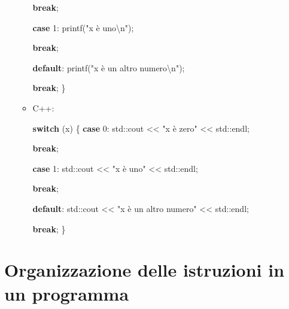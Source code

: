 \documentclass[
  letterpaper,
]{scrbook}
\newenvironment{Shaded}{\begin{snugshade}}{\end{snugshade}}
\newcommand{\BuiltInTok}[1]{\textcolor[rgb]{0.00,0.23,0.31}{#1}}
\newcommand{\ControlFlowTok}[1]{\textcolor[rgb]{0.00,0.23,0.31}{\textbf{#1}}}
\newcommand{\DecValTok}[1]{\textcolor[rgb]{0.68,0.00,0.00}{#1}}
\newcommand{\NormalTok}[1]{\textcolor[rgb]{0.00,0.23,0.31}{#1}}
\newcommand{\OperatorTok}[1]{\textcolor[rgb]{0.37,0.37,0.37}{#1}}
\newcommand{\SpecialCharTok}[1]{\textcolor[rgb]{0.37,0.37,0.37}{#1}}
\newcommand{\StringTok}[1]{\textcolor[rgb]{0.13,0.47,0.30}{#1}}
\begin{document}
\begin{itemize}
\begin{itemize}
\begin{Shaded}
\begin{Highlighting}[]
    \ControlFlowTok{break}\OperatorTok{;}

  \ControlFlowTok{case} \DecValTok{1}\OperatorTok{:}
\NormalTok{    printf}\OperatorTok{(}\StringTok{"x è uno}\SpecialCharTok{\textbackslash{}n}\StringTok{"}\OperatorTok{);}

    \ControlFlowTok{break}\OperatorTok{;}

  \ControlFlowTok{default}\OperatorTok{:}
\NormalTok{    printf}\OperatorTok{(}\StringTok{"x è un altro numero}\SpecialCharTok{\textbackslash{}n}\StringTok{"}\OperatorTok{);}

    \ControlFlowTok{break}\OperatorTok{;}
\OperatorTok{\}}
\end{Highlighting}
\end{Shaded}
  \item
    C++:

\begin{Shaded}
\begin{Highlighting}[]
\ControlFlowTok{switch} \OperatorTok{(}\NormalTok{x}\OperatorTok{)} \OperatorTok{\{}
  \ControlFlowTok{case} \DecValTok{0}\OperatorTok{:}
    \BuiltInTok{std::}\NormalTok{cout }\OperatorTok{\textless{}\textless{}} \StringTok{"x è zero"} \OperatorTok{\textless{}\textless{}} \BuiltInTok{std::}\NormalTok{endl}\OperatorTok{;}

    \ControlFlowTok{break}\OperatorTok{;}

  \ControlFlowTok{case} \DecValTok{1}\OperatorTok{:}
    \BuiltInTok{std::}\NormalTok{cout }\OperatorTok{\textless{}\textless{}} \StringTok{"x è uno"} \OperatorTok{\textless{}\textless{}} \BuiltInTok{std::}\NormalTok{endl}\OperatorTok{;}

    \ControlFlowTok{break}\OperatorTok{;}

  \ControlFlowTok{default}\OperatorTok{:}
    \BuiltInTok{std::}\NormalTok{cout }\OperatorTok{\textless{}\textless{}} \StringTok{"x è un altro numero"} \OperatorTok{\textless{}\textless{}} \BuiltInTok{std::}\NormalTok{endl}\OperatorTok{;}

    \ControlFlowTok{break}\OperatorTok{;}
\OperatorTok{\}}
\end{Highlighting}
\end{Shaded}
  \end{itemize}
\end{itemize}

\section{Organizzazione delle istruzioni in un
programma}\label{organizzazione-delle-istruzioni-in-un-programma}
\end{document}
